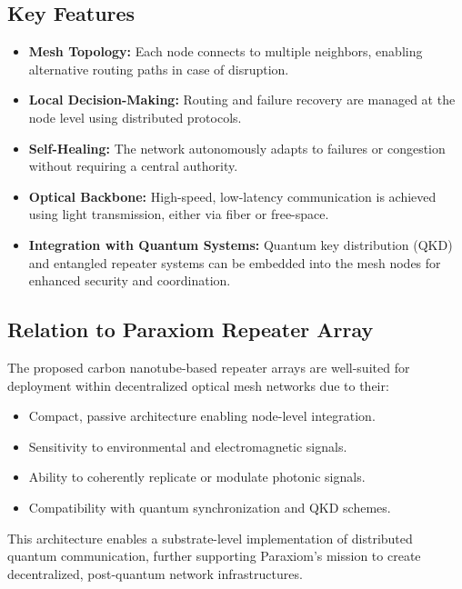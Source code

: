 \documentclass[11pt]{article}
\begin{document}
	\subsection*{Key Features}
	\begin{itemize}
		\item \textbf{Mesh Topology:} Each node connects to multiple neighbors, enabling alternative routing paths in case of disruption.
		\item \textbf{Local Decision-Making:} Routing and failure recovery are managed at the node level using distributed protocols.
		\item \textbf{Self-Healing:} The network autonomously adapts to failures or congestion without requiring a central authority.
		\item \textbf{Optical Backbone:} High-speed, low-latency communication is achieved using light transmission, either via fiber or free-space.
		\item \textbf{Integration with Quantum Systems:} Quantum key distribution (QKD) and entangled repeater systems can be embedded into the mesh nodes for enhanced security and coordination.
	\end{itemize}
	
	\subsection*{Relation to Paraxiom Repeater Array}
	The proposed carbon nanotube-based repeater arrays are well-suited for deployment within decentralized optical mesh networks due to their:
	\begin{itemize}
		\item Compact, passive architecture enabling node-level integration.
		\item Sensitivity to environmental and electromagnetic signals.
		\item Ability to coherently replicate or modulate photonic signals.
		\item Compatibility with quantum synchronization and QKD schemes.
	\end{itemize}
	
	This architecture enables a substrate-level implementation of distributed quantum communication, further supporting Paraxiom's mission to create decentralized, post-quantum network infrastructures.
	
\end{document}
